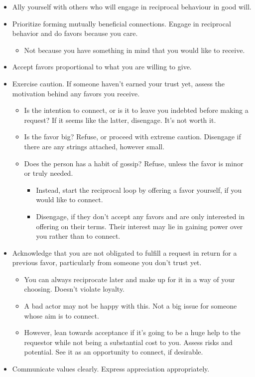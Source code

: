 \documentclass[
]{book}
\providecommand{\tightlist}{%
  \setlength{\itemsep}{0pt}\setlength{\parskip}{0pt}}
\begin{document}
\begin{itemize}
\tightlist
\item
  Ally yourself with others who will engage in reciprocal behaviour in good will.
\item
  Prioritize forming mutually beneficial connections. Engage in reciprocal behavior and do favors because you care.

  \begin{itemize}
  \tightlist
  \item
    Not because you have something in mind that you would like to receive.
  \end{itemize}
\item
  Accept favors proportional to what you are willing to give.
\item
  Exercise caution. If someone haven't earned your trust yet, assess the motivation behind any favors you receive.

  \begin{itemize}
  \tightlist
  \item
    Is the intention to connect, or is it to leave you indebted before making a request? If it seems like the latter, disengage. It's not worth it.
  \item
    Is the favor big? Refuse, or proceed with extreme caution. Disengage if there are any strings attached, however small.
  \item
    Does the person has a habit of gossip? Refuse, unless the favor is minor or truly needed.

    \begin{itemize}
    \tightlist
    \item
      Instead, start the reciprocal loop by offering a favor yourself, if you would like to connect.\\
    \item
      Disengage, if they don't accept any favors and are only interested in offering on their terms. Their interest may lie in gaining power over you rather than to connect.
    \end{itemize}
  \end{itemize}
\item
  Acknowledge that you are not obligated to fulfill a request in return for a previous favor, particularly from someone you don't trust yet.

  \begin{itemize}
  \tightlist
  \item
    You can always reciprocate later and make up for it in a way of your choosing. Doesn't violate loyalty.
  \item
    A bad actor may not be happy with this. Not a big issue for someone whose aim is to connect.
  \item
    However, lean towards acceptance if it's going to be a huge help to the requestor while not being a substantial cost to you. Assess risks and potential. See it as an opportunity to connect, if desirable.
  \end{itemize}
\item
  Communicate values clearly. Express appreciation appropriately.


\end{itemize}
\end{document}
